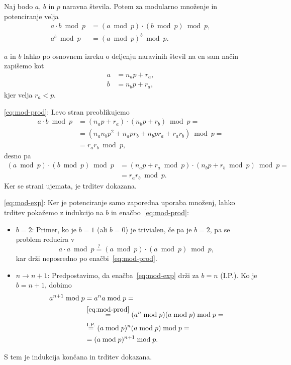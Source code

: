 \documentclass[isrm2, tisk]{fmfdelo}
\begin{document}
\begin{trditev}
    Naj bodo $a$, $b$ in $p$ naravna števila. Potem za modularno množenje in potenciranje velja
    \begin{align}
        a \cdot b \bmod p &= (a \bmod p) \cdot (b \bmod p) \bmod p, \label{eq:mod-prod} \\
        a^b \bmod p &= (a \bmod p)^b \bmod p. \label{eq:mod-exp} 
    \end{align}
\end{trditev}
\begin{dokaz}
    $a$ in $b$ lahko po osnovnem izreku o deljenju naravinih števil na en sam način zapišemo kot 
    \begin{align*}
        a &= n_a p + r_a, \\
        b &= n_b p + r_a,
    \end{align*}
    kjer velja $r_a < p$.
    
    \eqref{eq:mod-prod}: Levo stran preoblikujemo
    \begin{align*}
        a \cdot b \bmod p &= (n_a p + r_a) \cdot (n_b p + r_b) \bmod p = \\
                          &= (n_a n_b p^2 + n_a p r_b + n_b p r_a + r_a r_b) \bmod p = \\
                          &= r_a r_b \bmod p,
    \end{align*}
    desno pa
    \begin{align*}
        (a \bmod p) \cdot (b \bmod p) \bmod p &= (n_a p + r_a \bmod p) \cdot (n_b p + r_b \bmod p) \bmod p = \\
                          &= r_a r_b \bmod p.
    \end{align*}
    Ker se strani ujemata, je trditev dokazana.

    \eqref{eq:mod-exp}: Ker je potenciranje samo zaporedna uporaba množenj, lahko trditev pokažemo z 
    indukcijo na $b$ in enačbo~\eqref{eq:mod-prod}:
    \begin{itemize}
        \item $b = 2$: Primer, ko je $b = 1$ (ali $b = 0$) je trivialen, če pa je $b = 2$, pa se 
            problem reducira v 
            $$ 
            a \cdot a \bmod p \stackrel{?}{=} (a \bmod p) \cdot (a \bmod p) \bmod p,
            $$
            kar drži neposredno po enačbi~\eqref{eq:mod-prod}.
        \item $n \rightarrow n + 1$: Predpostavimo, da enačba~\eqref{eq:mod-exp} drži za $b = n$ (I.P.). 
            Ko je $b = n + 1$, dobimo 
            \begin{align*}
                a^{n + 1} \bmod p &= a^n a \bmod p = \\ 
                                  &\stackrel{\eqref{eq:mod-prod}}{=} (a^n \bmod p) (a \bmod p) \bmod p = \\
                                  &\stackrel{\text{I.P.}}{=} (a \bmod p)^n (a \bmod p) \bmod p = \\
                                  &= (a \bmod p)^{n + 1} \bmod p.
            \end{align*}
    \end{itemize}
    S tem je indukcija končana in trditev dokazana.
\end{dokaz}
\end{document}
